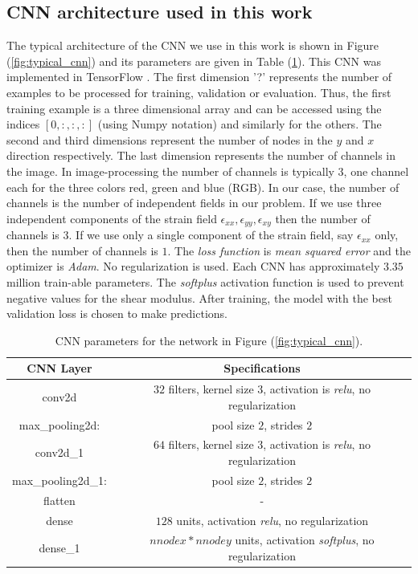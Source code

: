 \documentclass[12pt]{article}
\begin{document}
\subsection{\label{sect:cnnarch} CNN architecture used in this work}
The typical architecture of the CNN we use in this work is shown in Figure (\ref{fig:typical_cnn}) and its parameters are given in Table (\ref{tab:cnnparams}). This CNN was implemented in TensorFlow \cite{misc:tensorflow}. The first dimension '?' represents the number of examples to be processed for training, validation or evaluation. Thus, the first training example is a three dimensional array and can be accessed using the indices $[0,:,:,:]$ (using Numpy notation) and similarly for the others. The second and third dimensions represent the number of nodes in the $y$ and $x$ direction respectively. The last dimension represents the number of channels in the image. In image-processing the number of channels is typically $3$, one channel each for the three colors red, green and blue (RGB). In our case, the number of channels is the number of independent fields in our problem. If we use three independent components of the strain field $\epsilon_{xx},\epsilon_{yy},\epsilon_{xy}$ then the number of channels is $3$. If we use only a single component of the strain field, say $\epsilon_{xx}$ only, then the number of channels is $1$. The \textit{loss function} is \textit{mean squared error} and the optimizer is \textit{Adam}. No regularization is used.  Each CNN has approximately $3.35$ million train-able parameters. The \textit{softplus} activation function is used to prevent negative values for the shear modulus. After training, the model with the best validation loss is chosen to make predictions. 
\begin{table}
  \centering
 \begin{tabular}{|c|c|}
   \hline
   CNN Layer & Specifications \\
   \hline
   conv2d    & $32$ filters, kernel size $3$, activation is \textit{relu}, no regularization\\
   \hline
   max\_pooling2d: & pool size $2$, strides $2$\\
   \hline
   conv2d\_1 & $64$ filters, kernel size $3$, activation is \textit{relu}, no regularization\\
   \hline
   max\_pooling2d\_1: & pool size $2$, strides $2$\\
   \hline
   flatten & -\\
   \hline
   dense   & $128$ units, activation \textit{relu}, no regularization\\
   \hline
   dense\_1 & $nnodex*nnodey$ units, activation \textit{softplus}, no regularization\\
   \hline
 \end{tabular}
 \caption{\label{tab:cnnparams} CNN parameters for the network in Figure (\ref{fig:typical_cnn}).}
\end{table}
\end{document}
